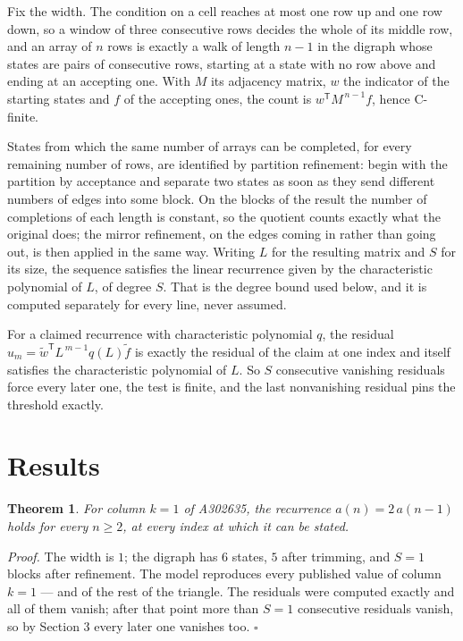 \documentclass[11pt]{article}
\newtheorem{theorem}{Theorem}
\theoremstyle{definition}
\begin{document}
Fix the width. The condition on a cell reaches at most one row up and one row down, so a window of three consecutive rows decides the whole of its middle row, and an array of $n$ rows is exactly a walk of length $n-1$ in the digraph whose states are pairs of consecutive rows, starting at a state with no row above and ending at an accepting one. With $M$ its adjacency matrix, $w$ the indicator of the starting states and $f$ of the accepting ones, the count is $w^{\mathsf T}M^{\,n-1}f$, hence C-finite.

States from which the same number of arrays can be completed, for every remaining number of rows, are identified by partition refinement: begin with the partition by acceptance and separate two states as soon as they send different numbers of edges into some block. On the blocks of the result the number of completions of each length is constant, so the quotient counts exactly what the original does; the mirror refinement, on the edges coming in rather than going out, is then applied in the same way. Writing $L$ for the resulting matrix and $S$ for its size, the sequence satisfies the linear recurrence given by the characteristic polynomial of $L$, of degree $S$. That is the degree bound used below, and it is computed separately for every line, never assumed.

For a claimed recurrence with characteristic polynomial $q$, the residual $u_m = \tilde w^{\mathsf T}L^{\,m-1}q(L)\tilde f$ is exactly the residual of the claim at one index and itself satisfies the characteristic polynomial of $L$. So $S$ consecutive vanishing residuals force every later one, the test is finite, and the last nonvanishing residual pins the threshold exactly.

\section{Results}

\begin{theorem} For column $k = 1$ of A302635, the recurrence $a(n) = 2\,a(n-1)$ holds for every $n \ge 2$, at every index at which it can be stated.\end{theorem}

{\itshape Proof.} The width is $1$; the digraph has $6$ states, $5$ after trimming, and $S = 1$ blocks after refinement. The model reproduces every published value of column $k = 1$ --- and of the rest of the triangle. The residuals were computed exactly and all of them vanish; after that point more than $S = 1$ consecutive residuals vanish, so by Section 3 every later one vanishes too. $\square$
\end{document}
